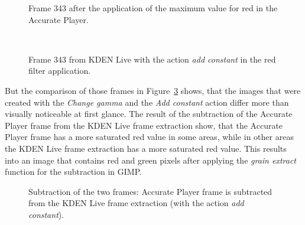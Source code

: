 \documentclass[../MasterThesis.tex]{subfiles}
\begin{document}
\begin{minipage}{0.48\textwidth}
	\begin{figure}[H]
		\begin{center}
			\caption[Frame 343 after the application of the red filter in the Accurate Player.]{Frame 343 after the application of the maximum value for red in the Accurate Player.}
			\label{figure:APframe2}
		\end{center}
	\end{figure}
\end{minipage}\begin{minipage}{0.04\textwidth}
	\ 
\end{minipage}\begin{minipage}{0.48\textwidth}
	\begin{figure}[H]
		\begin{center}
			\caption[Frame 343 from KDEN Live with the action \textit{add constant}.]{Frame 343 from KDEN Live with the action \textit{add constant} in the red filter application.}
			\label{figure:addconstant}
		\end{center}
	\end{figure}
\end{minipage}
\vspace*{1em}

But the comparison of those frames in Figure~\ref{figure:addconstantgimp} shows, that the images that were created with the \textit{Change gamma} and the \textit{Add constant} action differ more than visually noticeable at first glance. The result of the subtraction of the Accurate Player frame from the KDEN Live frame extraction show, that the Accurate Player frame has a more saturated red value in some areas, while in other areas the KDEN Live frame extraction has a more saturated red value. This results into an image that contains red and green pixels after applying the \textit{grain extract} function for the subtraction in GIMP.


\begin{figure}[H]
	\begin{center}
		\caption[Subtraction of KDEN Live (\textit{add constant}) and Accurate Player.]{Subtraction of the two frames: Accurate Player frame is subtracted from the KDEN Live frame extraction (with the action \textit{add constant}).}
		\label{figure:addconstantgimp}
	\end{center}
\end{figure}
\end{document}
